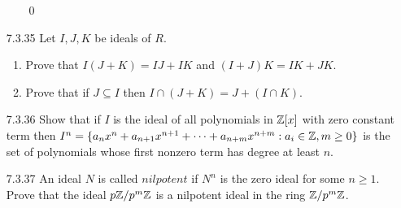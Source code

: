 \begin{enumerate}
\begin{enumerate}
               \qed
      \end{enumerate}
   \item[7.3.35]  Let $I, J, K$ be ideals of $R$.
                  \begin{enumerate}
                     \item Prove that $I(J + K) = IJ + IK$ and
                           $(I + J)K = IK + JK$.
                     \item Prove that if $J \subseteq I$ then
                           $I \cap (J + K) = J + (I \cap K)$.
                  \end{enumerate}
   \item[7.3.36]  Show that if $I$ is the ideal of all polynomials in $\mathbb{Z}[x]$
                  with zero constant term then $I^n = \{a_nx^n + a_{n+1}x^{n+1} 
                  + \cdots + a_{n+m}x^{n+m} : a_i \in \mathbb{Z}, m \ge 0\}$ is the set
                  of polynomials whose first nonzero term has degree at least
                  $n$.
   \item[7.3.37]  An ideal $N$ is called $\textit{nilpotent}$ if $N^n$ is the
                  zero ideal for some $n \ge 1$. Prove that the ideal
                  $p\mathbb{Z}/p^m\mathbb{Z}$ is a nilpotent ideal in the ring $\mathbb{Z}/p^m\mathbb{Z}$.
\end{enumerate}
